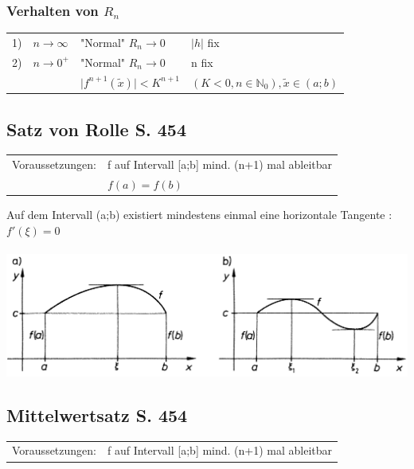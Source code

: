			
			\subsubsection{Verhalten von $R_n$}	
			
			\begin{tabular}{llll}
			1) & $n \rightarrow \infty$ & "Normal" \quad $R_n \rightarrow 0$ & $\vert h \vert$ fix  \\
			2) & $n \rightarrow 0^+$ & "Normal" \quad $R_n \rightarrow 0$ & n fix \\
			& &  $\vert f^{n+1}(\tilde{x})\vert < K^{n+1}$ & $(K < 0, n \in \mathbb{N}_0), \tilde{x} \in (a;b)$ \\
			\end{tabular}
			
			
			\subsection{Satz von Rolle S. 454}
			\begin{tabular}{ll}
			Voraussetzungen: & f auf Intervall [a;b] mind. (n+1) mal ableitbar\\
			 & $f(a) = f(b)$ \\
			\end{tabular}
			
			Auf dem Intervall (a;b) existiert mindestens einmal  eine horizontale Tangente : $f'(\xi) = 0$ \\			
			 \\
			 

			\includegraphics[width=0.9\linewidth]{Bilder/rolle}
			
			
			
			\subsection{Mittelwertsatz S. 454}			
			\begin{tabular}{ll}
			Voraussetzungen: &  f auf Intervall [a;b] mind. (n+1) mal ableitbar \\
			\end{tabular}

